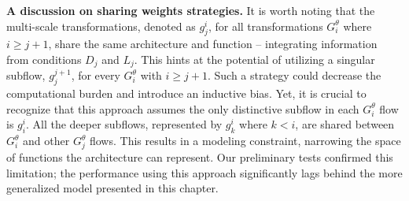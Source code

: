 \smallskip

\textbf{A discussion on sharing weights strategies.} It is worth noting that the multi-scale transformations, denoted as \(g_j^i\), for all transformations \(G_i^{\theta}\) where \(i \geq j+1\), share the same architecture and function – integrating information from conditions \(D_j\) and \(L_j\). This hints at the potential of utilizing a singular subflow, \(g_j^{j+1}\), for every \(G_i^{\theta}\) with \(i \geq j+1\). Such a strategy could decrease the computational burden and introduce an inductive bias. Yet, it is crucial to recognize that this approach assumes the only distinctive subflow in each \(G_i^{\theta}\) flow is \(g_i^i\). All the deeper subflows, represented by \(g_k^i\) where \(k<i\), are shared between \(G_i^{\theta}\) and other \(G_j^{\theta}\) flows. This results in a modeling constraint, narrowing the space of functions the architecture can represent. Our preliminary tests confirmed this limitation; the performance using this approach significantly lags behind the more generalized model presented in this chapter.

